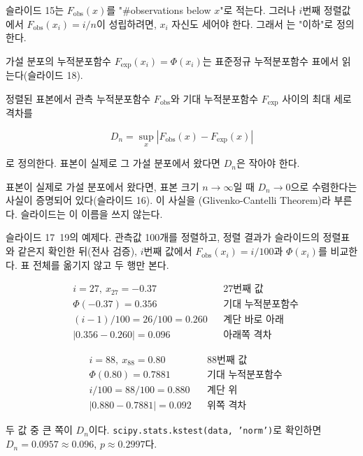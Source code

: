 \begin{pitfall}
슬라이드 15는 $F_{\text{obs}}(x)$를 "\#observations
below $x$"로 적는다. 그러나 $i$번째 정렬값에서 $F_{\text{obs}}(x_i) =
i/n$이 성립하려면, $x_i$ 자신도 세어야 한다. 그래서 는
"이하"로 정의한다.
\end{pitfall}

가설 분포의 누적분포함수 $F_{\text{exp}}(x_i) = \Phi(x_i)$는 표준정규
누적분포함수 표에서 읽는다(슬라이드 18).

\begin{definition}[KS 통계량]
\label{def:ks-statistic}
정렬된 표본에서 관측 누적분포함수 $F_{\text{obs}}$와 기대 누적분포함수
$F_{\text{exp}}$ 사이의 최대 세로 격차를

\[
  D_n = \sup_x \left| F_{\text{obs}}(x) - F_{\text{exp}}(x) \right|
\]

로 정의한다. 표본이 실제로 그 가설 분포에서 왔다면 $D_n$은 작아야
한다.
\end{definition}

\begin{aside}[참고]
표본이 실제로 가설 분포에서 왔다면, 표본 크기 $n \to \infty$일 때
$D_n \to 0$으로 수렴한다는 사실이 증명되어 있다(슬라이드 16). 이
사실을 (Glivenko-Cantelli Theorem)라
부른다. 슬라이드는 이 이름을 쓰지 않는다.
\end{aside}

\begin{example}[100개가 $N(0,1)$인가]
\label{ex:cd-ks-normal}
슬라이드 17~19의 예제다. 관측값 100개를 정렬하고,
정렬 결과가 슬라이드의 정렬표와 같은지 확인한 뒤(전사 검증), $i$번째
값에서 $F_{\text{obs}}(x_i) = i/100$과 $\Phi(x_i)$를 비교한다. 표
전체를 옮기지 않고 두 행만 본다.

\begin{align*}
  &i = 27,\ x_{27} = -0.37 && \text{27번째 값}\\
  &\Phi(-0.37) = 0.356 && \text{기대 누적분포함수}\\
  &(i-1)/100 = 26/100 = 0.260 && \text{계단 바로 아래}\\
  &|0.356 - 0.260| = 0.096 && \text{아래쪽 격차}
\end{align*}

\begin{align*}
  &i = 88,\ x_{88} = 0.80 && \text{88번째 값}\\
  &\Phi(0.80) = 0.7881 && \text{기대 누적분포함수}\\
  &i/100 = 88/100 = 0.880 && \text{계단 위}\\
  &|0.880 - 0.7881| = 0.092 && \text{위쪽 격차}
\end{align*}

두 값 중 큰 쪽이 $D_n$이다. \texttt{scipy.stats.kstest(data, 'norm')}로
확인하면 $D_n = 0.0957 \approx 0.096$, $p \approx 0.2997$다.
\end{example}

